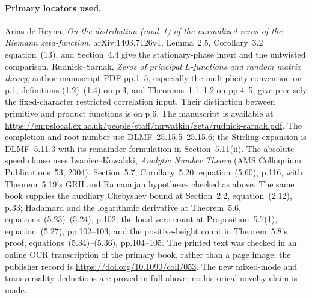 \paragraph{Primary locators used.}
Arias de Reyna, \emph{On the distribution (mod~1) of the normalized
zeros of the Riemann zeta-function}, arXiv:1403.7126v1,
Lemma~2.5, Corollary~3.2 equation~(13), and Section~4.4 give the
stationary-phase input and the untwisted comparison.
Rudnick--Sarnak, \emph{Zeros of principal $L$-functions and random
matrix theory}, author manuscript PDF pp.1--5, especially the
multiplicity convention on p.1, definitions (1.2)--(1.4) on p.3,
and Theorems~1.1--1.2 on pp.4--5, give precisely the fixed-character
restricted correlation input. Their distinction between primitive
and product functions is on p.6. The manuscript is available at
\url{https://empslocal.ex.ac.uk/people/staff/mrwatkin/zeta/rudnick-sarnak.pdf}.
The completion and root number use DLMF~25.15.5--25.15.6; the
Stirling expansion is DLMF~5.11.3 with its remainder formulation
in Section~5.11(ii). The absolute-speed clause uses
Iwaniec--Kowalski, \emph{Analytic Number Theory} (AMS Colloquium
Publications~53, 2004), Section~5.7, Corollary~5.20, equation~(5.60),
p.116, with Theorem~5.19's GRH and Ramanujan hypotheses checked
as above. The same book supplies the auxiliary Chebyshev bound at
Section~2.2, equation~(2.12), p.33; Hadamard and the logarithmic
derivative at Theorem~5.6, equations~(5.23)--(5.24), p.102; the
local zero count at Proposition~5.7(1), equation~(5.27), pp.102--103;
and the positive-height count in Theorem~5.8's proof,
equations~(5.34)--(5.36), pp.104--105.
The printed text was checked in an online OCR transcription
of the primary book, rather than a page image; the publisher record
is \url{https://doi.org/10.1090/coll/053}.
The new mixed-mode and transversality deductions
are proved in full above; no historical novelty claim is made.
